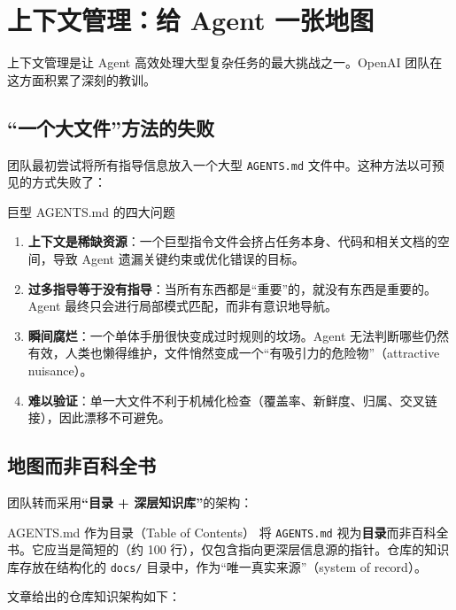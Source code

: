 \section{上下文管理：给 Agent 一张地图}

上下文管理是让 Agent 高效处理大型复杂任务的最大挑战之一。OpenAI 团队在这方面积累了深刻的教训。

\subsection{``一个大文件''方法的失败}

团队最初尝试将所有指导信息放入一个大型 \texttt{AGENTS.md} 文件中。这种方法以可预见的方式失败了：

\begin{warningbox}{巨型 AGENTS.md 的四大问题}
\begin{enumerate}[nosep]
  \item \textbf{上下文是稀缺资源}：一个巨型指令文件会挤占任务本身、代码和相关文档的空间，导致 Agent 遗漏关键约束或优化错误的目标。
  \item \textbf{过多指导等于没有指导}：当所有东西都是``重要''的，就没有东西是重要的。Agent 最终只会进行局部模式匹配，而非有意识地导航。
  \item \textbf{瞬间腐烂}：一个单体手册很快变成过时规则的坟场。Agent 无法判断哪些仍然有效，人类也懒得维护，文件悄然变成一个``有吸引力的危险物''（attractive nuisance）。
  \item \textbf{难以验证}：单一大文件不利于机械化检查（覆盖率、新鲜度、归属、交叉链接），因此漂移不可避免。
\end{enumerate}
\end{warningbox}

\subsection{地图而非百科全书}

团队转而采用\textbf{``目录 + 深层知识库''}的架构：

\begin{importantbox}{AGENTS.md 作为目录（Table of Contents）}
将 \texttt{AGENTS.md} 视为\textbf{目录}而非百科全书。它应当是简短的（约 100 行），仅包含指向更深层信息源的指针。仓库的知识库存放在结构化的 \texttt{docs/} 目录中，作为``唯一真实来源''（system of record）。
\end{importantbox}

文章给出的仓库知识架构如下：

